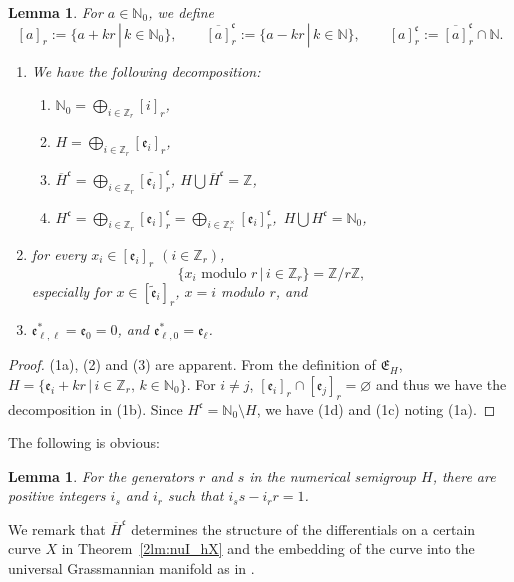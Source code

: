 \documentclass[pdftex]{sigma}
\def\ZZ{{\mathbb Z}}
\def\NN{{\mathbb N}}
\def\fE{{\mathfrak E}}
\def\fc{{\mathfrak c}}
\def\fe{{\mathfrak e}}
\def\tfe{{\widetilde{\mathfrak e}}}
\def\lH{{\overline H}}
\numberwithin{equation}{section}
\newtheorem{Lemma}[Theorem]{Lemma}
\begin{document}
\begin{Lemma}\label{2lm:NSG1}
For $a \in \NN_0$, we define
\[
[a]_r:= \{ a + k r \, | \, k \in \NN_0\}, \qquad
\overline{[a]}_r^\fc:=
\{ a - k r \, | \, k \in \NN\}, \qquad
[a]_r^\fc:=\overline{[a]}_r^\fc\cap \NN.
\]
\begin{enumerate}\itemsep=0pt
\item[$1.$] We have the following decomposition:
\begin{enumerate}\itemsep=0pt
\item[$(a)$]
$ \NN_0 = \bigoplus_{i\in \ZZ_r} [i]_r$,

\item[$(b)$]
$H = \bigoplus_{i\in \ZZ_r} [\fe_i]_r$,

\item[$(c)$]
$\lH^\fc = \bigoplus_{i\in \ZZ_r} \overline{[\fe_i]}_r^\fc$, $H\bigcup \lH^\fc=\ZZ$,


\item[$(d)$]
$H^\fc = \bigoplus_{i\in \ZZ_r} [\fe_i]_r^\fc
= \bigoplus_{i\in \ZZ_r^\times} [\fe_i]_r^\fc$,\ $H\bigcup H^\fc=\NN_0$,
\end{enumerate}

\item[$2.$] for every $x_i \in [\fe_i]_r$ $(i\in \ZZ_r)$,
\[
\{x_i \text{ modulo } r\, |\, i \in \ZZ_r\}=\ZZ/r \ZZ,
\]
especially for $x \in [\tfe_i]_r$, $x = i$ modulo $r$, and

\item[$3.$] $\fe_{\ell,\ell}^*=\fe_0=0$, and $\fe_{\ell,0}^* =\fe_{\ell}$.
\end{enumerate}
\end{Lemma}

\begin{proof}
(1a), (2) and (3) are apparent.
From the definition of $\fE_H$, $H= \{ \fe_i + k r \, |\, i \in \ZZ_r,\, k \in \NN_0\}$.
For $i \neq j$, $[\fe_i]_r\cap [\fe_j]_r = \varnothing$ and thus we have the decomposition in (1b).
Since $H^\fc = \NN_0 \setminus H$, we have (1d) and (1c) noting (1a).
\end{proof}

The following is obvious:

\begin{Lemma}\label{2lm:rs_iris}
For the generators $r$ and $s$ in the numerical semigroup $H$, there are positive integers $i_s$ and $i_r$ such that
$ i_s s- i_r r = 1$.
\end{Lemma}

We remark that $\lH^\fc$ determines the structure of the differentials on a certain curve $X$ in Theorem~\ref{2lm:nuI_hX} and the embedding of the curve into the universal Grassmannian manifold as in \cite[p.~46]{SegalWilson}.
\end{document}
